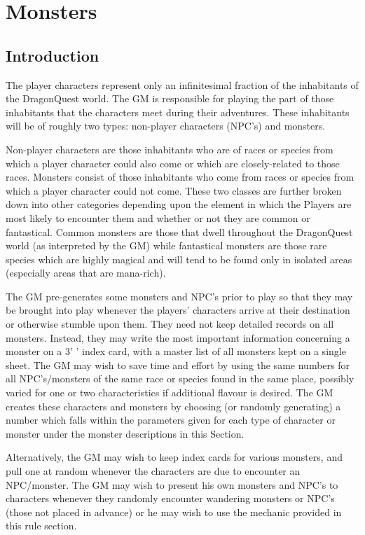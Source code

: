 \chapter*{Monsters}

\section{Introduction}

\begin{multicols}{3}

The player characters represent only an infinitesimal fraction of the
inhabitants of the DragonQuest world.  The GM is responsible for
playing the part of those inhabitants that the characters meet during
their adventures. These inhabitants will be of roughly two types:
non-player characters (NPC's) and monsters.

Non-player characters are those inhabitants who are of races or
species from which a player character could also come or which are
closely-related to those races.  Monsters consist of those inhabitants
who come from races or species from which a player character could not
come.  These two classes are further broken down into other categories
depending upon the element in which the Players are most likely to
encounter them and whether or not they are common or fantastical.
Common monsters are those that dwell throughout the DragonQuest world
(as interpreted by the GM) while fantastical monsters are those rare
species which are highly magical and will tend to be found only in
isolated areas (especially areas that are mana-rich).

The GM pre-generates some monsters and NPC's prior to play so that they
may be brought into play whenever the players' characters arrive at
their destination or otherwise stumble upon them.  They need not keep
detailed records on all monsters.  Instead, they may write the most
important information concerning a monster on a 3' ' index card,
with a master list of all monsters kept on a single sheet.  The GM may
wish to save time and effort by using the same numbers for all
NPC's/monsters of the same race or species found in the same place,
possibly varied for one or two characteristics if additional flavour is
desired.  The GM creates these characters and monsters by choosing (or
randomly generating) a number which falls within the parameters given
for each type of character or monster under the monster descriptions
in this Section.

Alternatively, the GM may wish to keep index cards for various
monsters, and pull one at random whenever the characters are due to
encounter an NPC/monster.  The GM may wish to present his own monsters
and NPC's to characters whenever they randomly encounter wandering
monsters or NPC's (those not placed in advance) or he may wish to use
the mechanic provided in this rule section.


\end{multicols}
